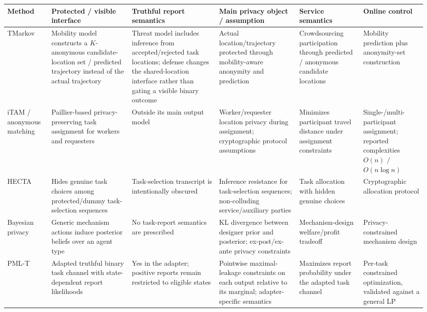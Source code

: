 \begin{tabular}{p{1.45cm}p{2.55cm}p{2.35cm}p{2.6cm}p{2.65cm}p{2.0cm}}
\toprule
Method & Protected / visible interface & Truthful report semantics & Main privacy object / assumption & Service semantics & Online control \\
\midrule
TMarkov~\cite{tmarkov} &
Mobility model constructs a $K$-anonymous candidate-location set / predicted trajectory instead of the actual trajectory &
Threat model includes inference from accepted/rejected task locations; defense changes the shared-location interface rather than gating a visible binary outcome &
Actual location/trajectory protected through mobility-aware anonymity and prediction &
Crowdsourcing participation through predicted / anonymous candidate locations &
Mobility prediction plus anonymity-set construction \\

iTAM / anonymous matching~\cite{itam2021,shutask2018} &
Paillier-based privacy-preserving task assignment for workers and requesters &
Outside its main output model &
Worker/requester location privacy during assignment; cryptographic protocol assumptions &
Minimizes participant travel distance under assignment constraints &
Single-/multi-participant assignment; reported complexities $O(n)$ / $O(n\log n)$ \\

HECTA~\cite{inference2026} &
Hides genuine task choices among protected/dummy task-selection sequences &
Task-selection transcript is intentionally obscured &
Inference resistance for task-selection sequences; non-colluding service/auxiliary parties &
Task allocation with hidden genuine choices &
Cryptographic allocation protocol \\

Bayesian privacy~\cite{bayesian} &
Generic mechanism actions induce posterior beliefs over an agent type &
No task-report semantics are prescribed &
KL divergence between designer prior and posterior; ex-post/ex-ante privacy constraints &
Mechanism-design welfare/profit tradeoff &
Privacy-constrained mechanism design \\

PML-T~\cite{pml2024} &
Adapted truthful binary task channel with state-dependent report likelihoods &
Yes in the adapter; positive reports remain restricted to eligible states &
Pointwise maximal-leakage constraints on each output relative to its marginal; adapter-specific semantics &
Maximizes report probability under the adapted task channel &
Per-task constrained optimization, validated against a general LP \\


\end{tabular}
